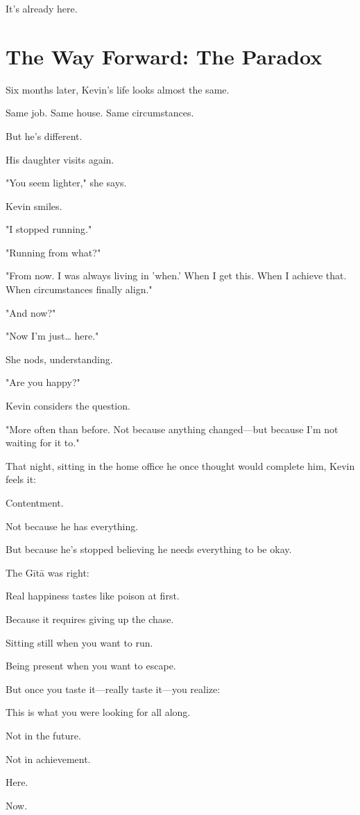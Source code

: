 \documentclass[11pt,twoside]{book}
\begin{document}
It's already here.

\section*{The Way Forward: The Paradox}

Six months later, Kevin's life looks almost the same.

Same job. Same house. Same circumstances.

But he's different.

His daughter visits again.

"You seem lighter," she says.

Kevin smiles.

"I stopped running."

"Running from what?"

"From now. I was always living in 'when.' When I get this. When I achieve that. When circumstances finally align."

"And now?"

"Now I'm just\ldots{} here."

She nods, understanding.

"Are you happy?"

Kevin considers the question.

"More often than before. Not because anything changed—but because I'm not waiting for it to."

That night, sitting in the home office he once thought would complete him, Kevin feels it:

Contentment.

Not because he has everything.

But because he's stopped believing he needs everything to be okay.

The Gītā was right:

Real happiness tastes like poison at first.

Because it requires giving up the chase.

Sitting still when you want to run.

Being present when you want to escape.

But once you taste it—really taste it—you realize:

This is what you were looking for all along.

Not in the future.

Not in achievement.

Here.

Now.
\end{document}
